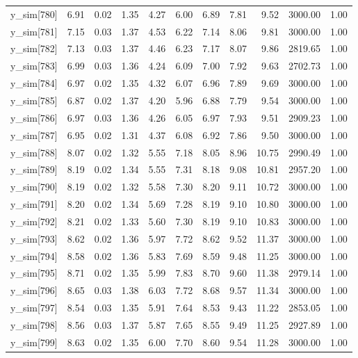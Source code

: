 \begin{table}[ht]
\begin{tabular}{rrrrrrrrrrr}
  y\_sim[780] & 6.91 & 0.02 & 1.35 & 4.27 & 6.00 & 6.89 & 7.81 & 9.52 & 3000.00 & 1.00 \\ 
  y\_sim[781] & 7.15 & 0.03 & 1.37 & 4.53 & 6.22 & 7.14 & 8.06 & 9.81 & 3000.00 & 1.00 \\ 
  y\_sim[782] & 7.13 & 0.03 & 1.37 & 4.46 & 6.23 & 7.17 & 8.07 & 9.86 & 2819.65 & 1.00 \\ 
  y\_sim[783] & 6.99 & 0.03 & 1.36 & 4.24 & 6.09 & 7.00 & 7.92 & 9.63 & 2702.73 & 1.00 \\ 
  y\_sim[784] & 6.97 & 0.02 & 1.35 & 4.32 & 6.07 & 6.96 & 7.89 & 9.69 & 3000.00 & 1.00 \\ 
  y\_sim[785] & 6.87 & 0.02 & 1.37 & 4.20 & 5.96 & 6.88 & 7.79 & 9.54 & 3000.00 & 1.00 \\ 
  y\_sim[786] & 6.97 & 0.03 & 1.36 & 4.26 & 6.05 & 6.97 & 7.93 & 9.51 & 2909.23 & 1.00 \\ 
  y\_sim[787] & 6.95 & 0.02 & 1.31 & 4.37 & 6.08 & 6.92 & 7.86 & 9.50 & 3000.00 & 1.00 \\ 
  y\_sim[788] & 8.07 & 0.02 & 1.32 & 5.55 & 7.18 & 8.05 & 8.96 & 10.75 & 2990.49 & 1.00 \\ 
  y\_sim[789] & 8.19 & 0.02 & 1.34 & 5.55 & 7.31 & 8.18 & 9.08 & 10.81 & 2957.20 & 1.00 \\ 
  y\_sim[790] & 8.19 & 0.02 & 1.32 & 5.58 & 7.30 & 8.20 & 9.11 & 10.72 & 3000.00 & 1.00 \\ 
  y\_sim[791] & 8.20 & 0.02 & 1.34 & 5.69 & 7.28 & 8.19 & 9.10 & 10.80 & 3000.00 & 1.00 \\ 
  y\_sim[792] & 8.21 & 0.02 & 1.33 & 5.60 & 7.30 & 8.19 & 9.10 & 10.83 & 3000.00 & 1.00 \\ 
  y\_sim[793] & 8.62 & 0.02 & 1.36 & 5.97 & 7.72 & 8.62 & 9.52 & 11.37 & 3000.00 & 1.00 \\ 
  y\_sim[794] & 8.58 & 0.02 & 1.36 & 5.83 & 7.69 & 8.59 & 9.48 & 11.25 & 3000.00 & 1.00 \\ 
  y\_sim[795] & 8.71 & 0.02 & 1.35 & 5.99 & 7.83 & 8.70 & 9.60 & 11.38 & 2979.14 & 1.00 \\ 
  y\_sim[796] & 8.65 & 0.03 & 1.38 & 6.03 & 7.72 & 8.68 & 9.57 & 11.34 & 3000.00 & 1.00 \\ 
  y\_sim[797] & 8.54 & 0.03 & 1.35 & 5.91 & 7.64 & 8.53 & 9.43 & 11.22 & 2853.05 & 1.00 \\ 
  y\_sim[798] & 8.56 & 0.03 & 1.37 & 5.87 & 7.65 & 8.55 & 9.49 & 11.25 & 2927.89 & 1.00 \\ 
  y\_sim[799] & 8.63 & 0.02 & 1.35 & 6.00 & 7.70 & 8.60 & 9.54 & 11.28 & 3000.00 & 1.00 \\ 

\end{tabular}
\end{table}

